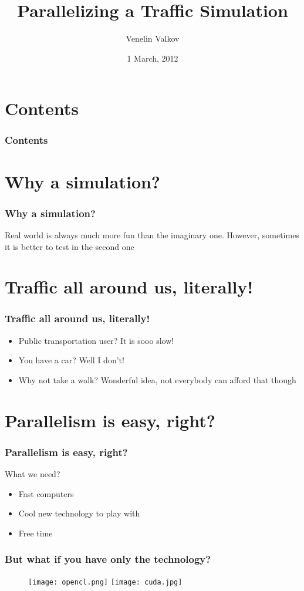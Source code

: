 \documentclass{beamer}
\title{Parallelizing a Traffic Simulation}
\author{Venelin Valkov}
\institute[University of Plovdiv]{Faculty of Mathematics and Informatics\\University of Plovdiv}
\date{1 March, 2012}
\begin{document}
  \frame
  {
    \titlepage
  }

  \section*{Contents}

  \frame
  {
    \frametitle{Contents}

    \tableofcontents
  }

  \section{Why a simulation?}

  \frame
  {
    \frametitle{Why a simulation?}

    Real world is always much more fun than the imaginary one. However, sometimes it is better to test in the second one
  }
  
  \section{Traffic all around us, literally!}
  \frame
  {
  	\frametitle{Traffic all around us, literally!}
  	\begin{itemize}
  		\item Public transportation user? It is sooo slow!
  		\item You have a car? Well I don't!
  		\item Why not take a walk? Wonderful idea, not everybody can afford that though
	\end{itemize}
}
  \section{Parallelism is easy, right?}
  \frame
  {
  	\frametitle{Parallelism is easy, right?}
  	What we need?
  	\begin{itemize}
  		\item Fast computers
  		\item Cool new technology to play with
  		\item Free time
	\end{itemize}  	
  }  
  
  \frame
  {
    \frametitle{But what if you have only the technology?}
	\begin{figure}
      \scalebox{0.50}
      {
        \texttt{[image: opencl.png]}
      }
            \scalebox{0.30}
      {
        \texttt{[image: cuda.jpg]}
      }
    \end{figure}
  }
  
\end{document}
